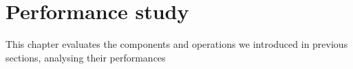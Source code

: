 \chapter{Performance study}
    This chapter evaluates the components and operations we introduced in previous sections, analysing their performances

    
     
    
